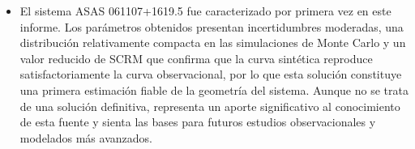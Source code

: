 \begin{itemize}
\item El sistema ASAS 061107+1619.5 fue caracterizado por primera vez en este informe. Los parámetros obtenidos presentan incertidumbres moderadas, una distribución relativamente compacta en las simulaciones de Monte Carlo y un valor reducido de SCRM  que confirma que la curva sintética reproduce satisfactoriamente la curva observacional, por lo que esta solución constituye una primera estimación fiable de la geometría del sistema. Aunque no se trata de una solución definitiva, representa un aporte significativo al conocimiento de esta fuente y sienta las bases para futuros estudios observacionales y modelados más avanzados.
\end{itemize}

